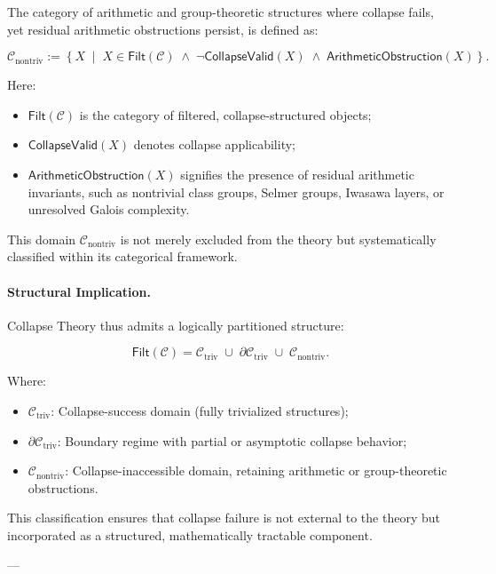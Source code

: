 \documentclass[11pt]{article}
\begin{document}
The category of arithmetic and group-theoretic structures where collapse fails, yet residual arithmetic obstructions persist, is defined as:

\[
\mathcal{C}_{\mathrm{nontriv}} := \left\{ X \;\middle|\; X \in \mathsf{Filt}(\mathcal{C}) \;\land\; \neg \mathsf{CollapseValid}(X) \;\land\; \mathsf{ArithmeticObstruction}(X) \right\}.
\]

Here:
\begin{itemize}
    \item $\mathsf{Filt}(\mathcal{C})$ is the category of filtered, collapse-structured objects;
    \item $\mathsf{CollapseValid}(X)$ denotes collapse applicability;
    \item $\mathsf{ArithmeticObstruction}(X)$ signifies the presence of residual arithmetic invariants, such as nontrivial class groups, Selmer groups, Iwasawa layers, or unresolved Galois complexity.
\end{itemize}

This domain $\mathcal{C}_{\mathrm{nontriv}}$ is not merely excluded from the theory but systematically classified within its categorical framework.

\paragraph{Structural Implication.}

Collapse Theory thus admits a logically partitioned structure:

\[
\mathsf{Filt}(\mathcal{C}) = \mathcal{C}_{\mathrm{triv}} \;\cup\; \partial \mathcal{C}_{\mathrm{triv}} \;\cup\; \mathcal{C}_{\mathrm{nontriv}}.
\]

Where:
\begin{itemize}
    \item $\mathcal{C}_{\mathrm{triv}}$: Collapse-success domain (fully trivialized structures);
    \item $\partial \mathcal{C}_{\mathrm{triv}}$: Boundary regime with partial or asymptotic collapse behavior;
    \item $\mathcal{C}_{\mathrm{nontriv}}$: Collapse-inaccessible domain, retaining arithmetic or group-theoretic obstructions.
\end{itemize}

This classification ensures that collapse failure is not external to the theory but incorporated as a structured, mathematically tractable component.

---
\end{document}
